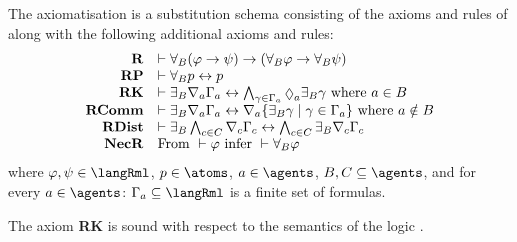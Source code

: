 \begin{definition}
    The axiomatisation \axiomRmlK{} is a substitution schema consisting of the axioms and rules of \axiomK{} along with the following additional axioms and rules:
$$
\begin{array}{rl}
    {\bf R} & \proves \allrefsBs (\phi \implies \psi) \implies (\allrefsBs \phi \implies \allrefsBs \psi)\\
    {\bf RP} & \proves \allrefsBs \atomP \iff \atomP\\
    {\bf RK} & \proves \somerefsBs \coversA \Gamma_\agentA \iff \bigwedge_{\gamma \in \Gamma_\agentA} \possibleA \somerefsBs \gamma \text{ where } \agentA \in \agentsB\\
    {\bf RComm} & \proves \somerefsBs \coversA \Gamma_\agentA \iff \coversA \{\somerefsBs \gamma \mid \gamma \in \Gamma_\agentA\} \text{ where } \agentA \notin \agentsB\\
    {\bf RDist} & \proves \somerefsBs \bigwedge_{\agentC \in \agentsC} \coversC \Gamma_\agentC \iff \bigwedge_{\agentC \in \agentsC} \somerefsBs \coversC \Gamma_\agentC\\
    {\bf NecR} & \text{From } \proves \phi \text{ infer } \proves \allrefsBs \phi
\end{array}
$$
where $\phi, \psi \in \langRml$, $\atomP \in \atoms$, $\agentA \in \agents$, $\agentsB, \agentsC \subseteq \agents$, and for every $\agentA \in \agents$: $\Gamma_\agentA \subseteq \langRml$ is a finite set of formulas.
\end{definition}

\begin{lemma}\label{rml-k-rk}
The axiom {\bf RK} is sound with respect to the semantics of the logic \logicRmlK{}.
\end{lemma}

